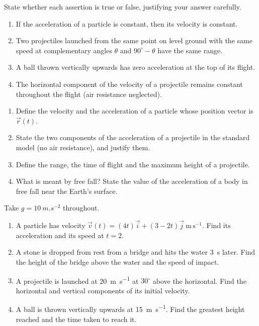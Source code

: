 \documentclass[11pt]{article}
\newcommand{\cle}[1]{{\popxbold\color{popdark}#1}}
\begin{document}
\begin{exercice}
State whether each assertion is true or false, justifying your answer carefully.
\begin{enumerate}
\item If the acceleration of a particle is constant, then its velocity is constant.
\item Two projectiles launched from the same point on level ground with the same speed at complementary angles $\theta$ and $90^\circ - \theta$ have the same range.
\item A ball thrown vertically upwards has zero acceleration at the top of its flight.
\item The horizontal component of the velocity of a projectile remains constant throughout the flight (air resistance neglected).
\end{enumerate}
\end{exercice}

\begin{exercice}
\begin{enumerate}
\item Define the \cle{velocity} and the \cle{acceleration} of a particle whose position vector is $\vec{r}(t)$.
\item State the two components of the acceleration of a projectile in the standard model (no air resistance), and justify them.
\item Define the \cle{range}, the \cle{time of flight} and the \cle{maximum height} of a projectile.
\item What is meant by \cle{free fall}? State the value of the acceleration of a body in free fall near the Earth's surface.
\end{enumerate}
\end{exercice}

\begin{exercice}
Take $g = \SI{10}{m.s^{-2}}$ throughout.
\begin{enumerate}
\item A particle has velocity $\vec{v}(t) = (4t)\vec{i} + (3 - 2t)\vec{j}\ \mathrm{m\,s^{-1}}$. Find its acceleration and its speed at $t = 2$.
\item A stone is dropped from rest from a bridge and hits the water \SI{3}{s} later. Find the height of the bridge above the water and the speed of impact.
\item A projectile is launched at \SI{20}{m.s^{-1}} at $30^\circ$ above the horizontal. Find the horizontal and vertical components of its initial velocity.
\item A ball is thrown vertically upwards at \SI{15}{m.s^{-1}}. Find the greatest height reached and the time taken to reach it.
\end{enumerate}
\end{exercice}
\end{document}
